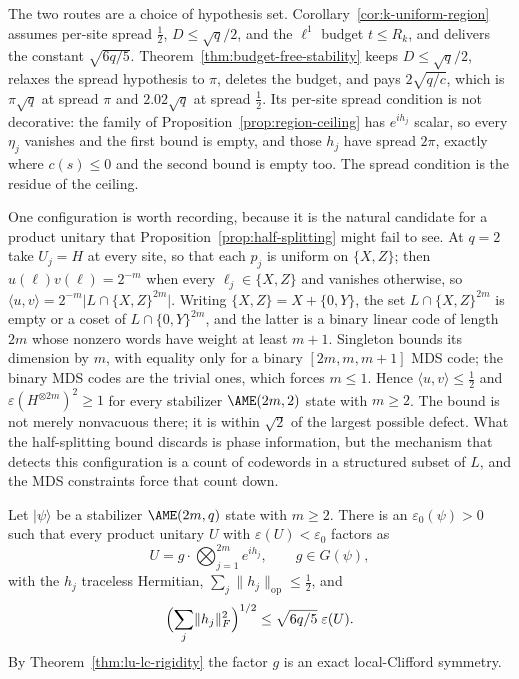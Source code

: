 The two routes are a choice of hypothesis set.
Corollary~\ref{cor:k-uniform-region} assumes per-site spread \(\frac12\),
\(D\leq\sqrt q/2\), and the \(\ell^1\) budget \(t\leq R_k\), and delivers
the constant \(\sqrt{6q/5}\).  Theorem~\ref{thm:budget-free-stability}
keeps \(D\leq\sqrt q/2\), relaxes the spread hypothesis to \(\pi\), deletes
the budget, and pays \(2\sqrt{q/c}\), which is \(\pi\sqrt q\) at spread
\(\pi\) and \(2.02\sqrt q\) at spread \(\frac12\).  Its per-site spread
condition is not decorative: the family of
Proposition~\ref{prop:region-ceiling} has \(e^{ih_j}\) scalar, so every
\(\eta_j\) vanishes and the first bound is empty, and those \(h_j\) have
spread \(2\pi\), exactly where \(c(s)\leq0\) and the second bound is empty
too.  The spread condition is the residue of the ceiling.

One configuration is worth recording, because it is the natural candidate
for a product unitary that Proposition~\ref{prop:half-splitting} might fail
to see.  At \(q=2\) take \(U_j=H\) at every site, so that each \(p_j\) is
uniform on \(\{X,Z\}\); then \(u(\ell)v(\ell)=2^{-m}\) when every
\(\ell_j\in\{X,Z\}\) and vanishes otherwise, so
\(\langle u,v\rangle=2^{-m}\lvert L\cap\{X,Z\}^{2m}\rvert\).  Writing
\(\{X,Z\}=X+\{0,Y\}\), the set \(L\cap\{X,Z\}^{2m}\) is empty or a coset of
\(L\cap\{0,Y\}^{2m}\), and the latter is a binary linear code of length
\(2m\) whose nonzero words have weight at least \(m+1\).  Singleton bounds
its dimension by \(m\), with equality only for a binary
\([2m,m,m+1]\) MDS code; the binary MDS codes are the trivial ones, which
forces \(m\leq1\).  Hence \(\langle u,v\rangle\leq\frac12\) and
\(\varepsilon(H^{\otimes2m})^2\geq1\) for every stabilizer
\(\AME(2m,2)\) state with \(m\geq2\).  The bound is not merely nonvacuous
there; it is within \(\sqrt2\) of the largest possible defect.  What the
half-splitting bound discards is phase information, but the mechanism that
detects this configuration is a count of codewords in a structured subset
of \(L\), and the MDS constraints force that count down.

\begin{corollary}
\label{cor:approximate-decomposition}
Let \(\lvert\psi\rangle\) be a stabilizer \(\AME(2m,q)\) state with
\(m\geq2\).  There is an \(\varepsilon_0(\psi)>0\) such that every product
unitary \(U\) with \(\varepsilon(U)<\varepsilon_0\) factors as
\[
 U=g\cdot\bigotimes_{j=1}^{2m}e^{ih_j},\qquad g\in G(\psi),
\]
with the \(h_j\) traceless Hermitian,
\(\sum_j\lVert h_j\rVert_{\mathrm{op}}\leq\frac12\), and
\[
 \Bigl(\sum_j\lVert h_j\rVert_F^2\Bigr)^{1/2}
   \leq\sqrt{6q/5}\;\varepsilon(U).
\]
By Theorem~\ref{thm:lu-lc-rigidity} the factor \(g\) is an exact
local-Clifford symmetry.
\end{corollary}

